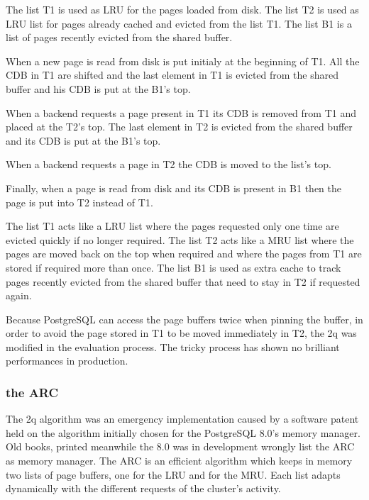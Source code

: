 The list T1 is used as LRU for the pages loaded from disk. The list T2 is used as LRU list for pages already cached 
and evicted from the list T1. The list B1 is a list of pages recently evicted from the shared buffer.

When a new page is read from disk is put initialy at the beginning of T1. All the CDB in T1 are shifted and the 
last element in T1 is evicted from the shared buffer and his CDB is put at the B1's top.\newline 

When a backend requests a page present in T1 its CDB is removed from T1 and placed at the T2's top. The last 
element in T2 is  evicted from the shared buffer and its CDB is put at the B1's top.\newline

When a backend requests a page in T2 the CDB is moved to the list's top.\newline

Finally, when a page is read from disk and its CDB is present in B1 then the page is put into T2 instead of 
T1.\newline

The list T1 acts like a LRU list where the pages requested only one time are evicted quickly if no longer required. 
The list T2 acts like a MRU list where the pages are moved back on the top when required and where the pages from 
T1 are stored if required more than once. The list B1 is used as extra cache to track pages recently evicted from 
the shared buffer that need to stay in T2 if requested again.\newline

Because PostgreSQL can access the page buffers twice when pinning the buffer, in order to avoid the page stored in 
T1 to be moved immediately in T2, the 2q was modified in the evaluation process. The tricky process has shown no 
brilliant performances in production.


\subsubsection{the ARC}
The 2q algorithm was an emergency implementation caused by a software patent held on the algorithm initially 
chosen for the PostgreSQL 8.0's memory manager. Old books, printed meanwhile the 8.0 was in development 
wrongly list the ARC as memory manager. The ARC is an efficient algorithm which keeps in memory two 
lists of page buffers, one for the LRU and for the MRU. Each list adapts dynamically with the different requests 
of the cluster's activity. 

